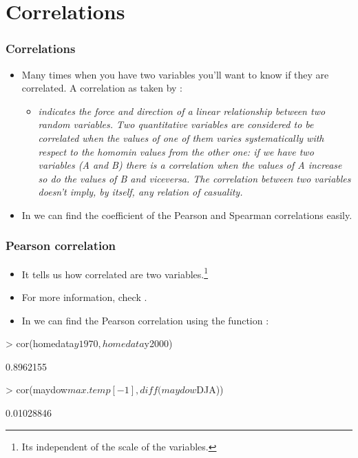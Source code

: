 \section{Correlations}

\begin{frame}[allowframebreaks]
  \frametitle{Correlations}
  \begin{itemize}
  \item Many times when you have two variables you'll want to know if they are correlated. A correlation as taken by :
  \begin{itemize}
    \item \emph{indicates the force and direction of a linear relationship between two random variables. Two quantitative variables are considered to be correlated when the values of one of them varies systematically with respect to the homomin values from the other one: if we have two variables (A and B) there is a correlation when the values of A increase so do the values of B and viceversa. The correlation between two variables doesn't imply, by itself, any relation of casuality.}

  \end{itemize}
  \item In  we can find the coefficient of the Pearson and Spearman correlations easily.
  \end{itemize}
\end{frame}  

\begin{frame}
  \frametitle{Pearson correlation}
  \begin{itemize}
  \item It tells us how correlated are two variables.\footnote{Its independent of the scale of the variables.}
  \item For more information, check .
  \item In  we can find the Pearson correlation using the function :
  \end{itemize}
\begin{Schunk}
\begin{Sinput}
> cor(homedata$y1970, homedata$y2000)
\end{Sinput}
\begin{Soutput}
[1] 0.8962155
\end{Soutput}
\begin{Sinput}
> cor(maydow$max.temp[-1], diff(maydow$DJA))
\end{Sinput}
\begin{Soutput}
[1] 0.01028846
\end{Soutput}
\end{Schunk}
\end{frame}  

